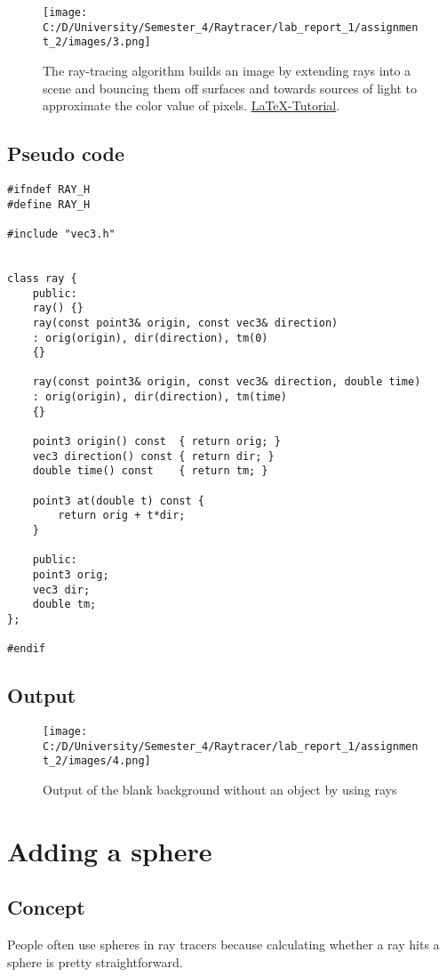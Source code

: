 \documentclass{article}
\begin{document}
\begin{figure}[h]
	
	\texttt{[image: C:/D/University/Semester\_4/Raytracer/lab\_report\_1/assignment\_2/images/3.png]}
	
	\caption{The ray-tracing algorithm builds an image by extending rays into a scene and bouncing them off surfaces and towards sources of light to approximate the color value of pixels. \href{https://en.wikipedia.org/wiki/Ray_tracing_(graphics)}{LaTeX-Tutorial}.}
	\label{fig:boat1}
\end{figure}

\subsection{Pseudo code}
\begin{lstlisting}
#ifndef RAY_H
#define RAY_H

#include "vec3.h"


class ray {
	public:
	ray() {}
	ray(const point3& origin, const vec3& direction)
	: orig(origin), dir(direction), tm(0)
	{}
	
	ray(const point3& origin, const vec3& direction, double time)
	: orig(origin), dir(direction), tm(time)
	{}
	
	point3 origin() const  { return orig; }
	vec3 direction() const { return dir; }
	double time() const    { return tm; }
	
	point3 at(double t) const {
		return orig + t*dir;
	}
	
	public:
	point3 orig;
	vec3 dir;
	double tm;
};

#endif
\end{lstlisting}

\subsection{Output}
\begin{figure}[h]
	
	\texttt{[image: C:/D/University/Semester\_4/Raytracer/lab\_report\_1/assignment\_2/images/4.png]}
	
	\caption{Output of the blank background without an object by using rays}
	\label{fig:boat1}
\end{figure}

\section{Adding a sphere}
\subsection{Concept}
People often use spheres in ray tracers because
calculating whether a ray hits a sphere is pretty straightforward.
\end{document}
